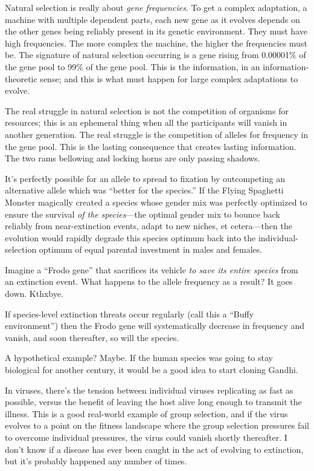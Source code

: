 {
 Natural selection is really about \textit{gene frequencies}. To
get a complex adaptation, a machine with multiple dependent parts, each
new gene as it evolves depends on the other genes being reliably
present in its genetic environment. They must have high frequencies.
The more complex the machine, the higher the frequencies must be. The
signature of natural selection occurring is a gene rising from
0.00001\% of the gene pool to 99\% of the gene pool. This is the
information, in an information-theoretic sense; and this is what must
happen for large complex adaptations to evolve.}

{
 The real struggle in natural selection is not the competition of
organisms for resources; this is an ephemeral thing when all the
participants will vanish in another generation. The real struggle is
the competition of alleles for frequency in the gene pool. This is the
lasting consequence that creates lasting information. The two rams
bellowing and locking horns are only passing shadows.}

{
 It's perfectly possible for an allele to spread to
fixation by outcompeting an alternative allele which was
``better for the species.'' If the
Flying Spaghetti Monster magically created a species whose gender mix
was perfectly optimized to ensure the survival \textit{of the
species}{}---the optimal gender mix to bounce back reliably from
near-extinction events, adapt to new niches, et cetera---then the
evolution would rapidly degrade this species optimum back into the
individual-selection optimum of equal parental investment in males and
females.}

{
 Imagine a ``Frodo gene'' that
sacrifices its vehicle \textit{to save its entire species} from an
extinction event. What happens to the allele frequency as a result? It
goes down. Kthxbye.}

{
 If species-level extinction threats occur regularly (call this a
``Buffy environment'') then the
Frodo gene will systematically decrease in frequency and vanish, and
soon thereafter, so will the species.}

{
 A hypothetical example? Maybe. If the human species was going to
stay biological for another century, it would be a good idea to start
cloning Gandhi.}

{
 In viruses, there's the tension between individual
viruses replicating as fast as possible, versus the benefit of leaving
the host alive long enough to transmit the illness. This is a good
real-world example of group selection, and if the virus evolves to a
point on the fitness landscape where the group selection pressures fail
to overcome individual pressures, the virus could vanish shortly
thereafter. I don't know if a disease has ever been
caught in the act of evolving to extinction, but it's
probably happened any number of times.}

